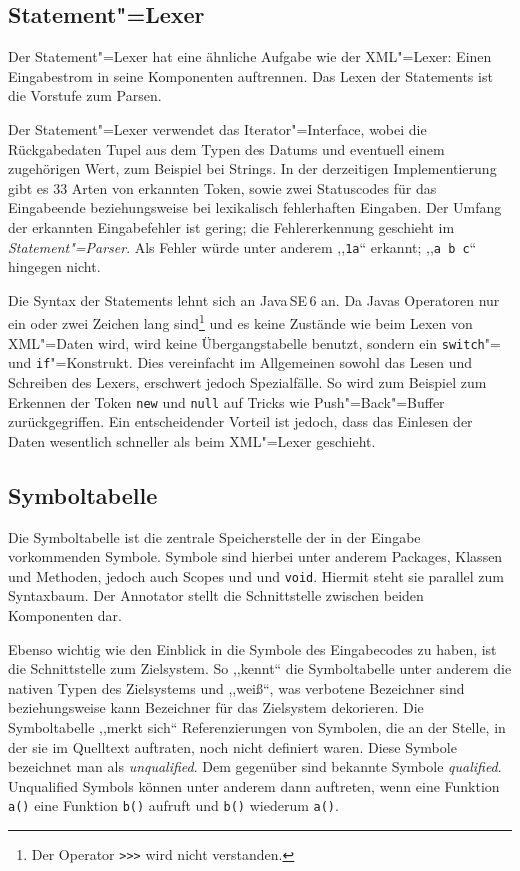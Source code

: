 \documentclass[10pt,a4paper,ngerman,titlepage,tocindentauto]{scrartcl}
\begin{document}
		\subsection{Statement"=Lexer}
			Der Statement"=Lexer hat eine ähnliche Aufgabe wie der XML"=Lexer: Einen Eingabestrom in seine
			Komponenten auftrennen. Das Lexen der Statements ist die Vorstufe zum Parsen.
			
			Der Statement"=Lexer verwendet das Iterator"=Interface, wobei die Rückgabedaten
			Tupel aus dem Typen des Datums und eventuell einem zugehörigen Wert, zum Beispiel bei Strings.
			In der derzeitigen Implementierung gibt es 33 Arten von erkannten Token, sowie zwei
			Statuscodes für das Eingabeende beziehungsweise bei lexikalisch fehlerhaften Eingaben.
			Der Umfang der erkannten Eingabefehler ist gering; die Fehlererkennung geschieht im
			{\em Statement"=Parser}. Als Fehler würde unter anderem ,,\verb|1a|`` erkannt; ,,\verb|a b c|`` hingegen nicht.
			
			Die Syntax der Statements lehnt sich an Java\,SE\,6 an. Da Javas Operatoren nur ein oder
			zwei Zeichen lang sind\footnote{Der Operator \texttt{{>}>{>}} wird nicht verstanden.} und es keine Zustände wie beim
			Lexen von XML"=Daten wird, wird keine Übergangstabelle benutzt, sondern ein \verb|switch|"= und
			\verb|if|"=Konstrukt. Dies vereinfacht im Allgemeinen sowohl das Lesen und Schreiben des Lexers,
			erschwert jedoch Spezialfälle. So wird zum Beispiel zum Erkennen der Token \verb|new| und
			\verb|null| auf Tricks wie Push"=Back"=Buffer zurückgegriffen.
			Ein entscheidender Vorteil ist jedoch, dass das Einlesen der Daten wesentlich schneller
			als beim XML"=Lexer geschieht.
	
		\subsection{Symboltabelle}
			Die Symboltabelle ist die zentrale Speicherstelle der in der Eingabe vorkommenden Symbole.
			Symbole sind hierbei unter anderem Packages, Klassen und Methoden, jedoch auch Scopes und und \texttt{void}.
			Hiermit steht sie parallel zum Syntaxbaum. Der Annotator stellt die Schnittstelle zwischen beiden
			Komponenten dar.
			
			Ebenso wichtig wie den Einblick in die Symbole des Eingabecodes zu haben, ist die Schnittstelle
			zum Zielsystem. So ,,kennt`` die Symboltabelle unter anderem die nativen Typen des Zielsystems und
			,,weiß``, was verbotene Bezeichner sind beziehungsweise kann Bezeichner für das Zielsystem
			dekorieren. Die Symboltabelle ,,merkt sich`` Referenzierungen von Symbolen, die an der Stelle, in
			der sie im Quelltext auftraten, noch nicht definiert waren. Diese Symbole bezeichnet man als
			{\em unqualified}. Dem gegenüber sind bekannte Symbole {\em qualified}. Unqualified Symbols können
			unter anderem dann auftreten, wenn eine Funktion \texttt{a()} eine Funktion \texttt{b()} aufruft
			und \texttt{b()} wiederum \texttt{a()}.
			
\end{document}
